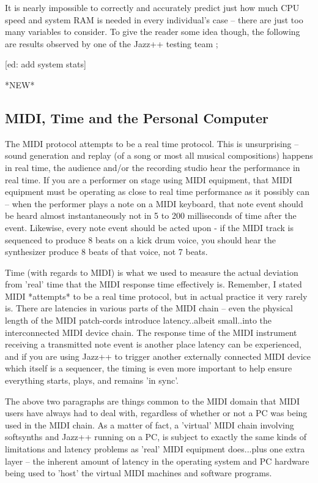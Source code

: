 \documentclass[letterpaper]{report}
\begin{document}
It is nearly impossible to correctly and accurately predict just how much CPU
speed and system RAM is needed in every individual's case -- there are just too
many variables to consider. To give the reader some idea though, the following
are results observed by one of the Jazz++ testing team ;

[ed: add system stats]



*NEW*

\subsection{MIDI, Time and the Personal Computer}

The MIDI protocol attempts to be a real time protocol. This is unsurprising --
sound generation and replay (of a song or most all musical compositions) happens
in real time, the audience and/or the recording studio hear the performance in
real time. If you are a performer on stage using MIDI equipment, that MIDI
equipment must be operating as close to real time performance as it possibly can
-- when the performer plays a note on a MIDI keyboard, that note event should be
heard almost instantaneously not in 5 to 200 milliseconds of time after the
event. Likewise, every note event should be acted upon - if the MIDI track is
sequenced to produce 8 beats on a kick drum voice, you should hear the
synthesizer produce 8 beats of that voice, not 7 beats.

Time (with regards to MIDI) is what we used to measure the actual deviation from
'real' time that the MIDI response time effectively is. Remember, I stated MIDI
*attempts* to be a real time protocol, but in actual practice it very rarely is.
There are latencies in various parts of the MIDI chain -- even the physical
length of the MIDI patch-cords introduce latency..albeit small..into the
interconnected MIDI device chain. The response time of the MIDI instrument
receiving a transmitted note event is another place latency can be experienced,
and if you are using Jazz++ to trigger another externally connected MIDI device
which itself is a sequencer, the timing is even more important to help ensure
everything starts, plays, and remains 'in sync'.

The above two paragraphs are things common to the MIDI domain that MIDI users
have always had to deal with, regardless of whether or not a PC was being used
in the MIDI chain. As a matter of fact, a 'virtual' MIDI chain involving
softsynths and Jazz++ running on a PC, is subject to exactly the same kinds of
limitations and latency problems as 'real' MIDI equipment does...plus one extra
layer -- the inherent amount of latency in the operating system and PC hardware
being used to 'host' the virtual MIDI machines and software programs.
\end{document}
